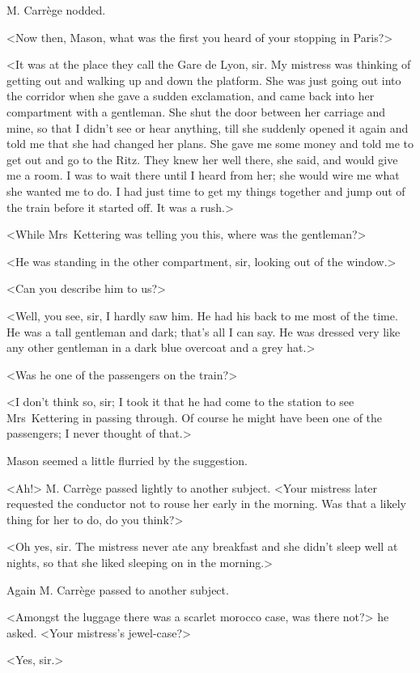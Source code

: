 M. Carrège nodded.

<Now then, Mason, what was the first you heard of your stopping in Paris?>

<It was at the place they call the Gare de Lyon, sir. My mistress was thinking of getting out and walking up and down the platform. She was just going out into the corridor when she gave a sudden exclamation, and came back into her compartment with a gentleman. She shut the door between her carriage and mine, so that I didn't see or hear anything, till she suddenly opened it again and told me that she had changed her plans. She gave me some money and told me to get out and go to the Ritz. They knew her well there, she said, and would give me a room. I was to wait there until I heard from her; she would wire me what she wanted me to do. I had just time to get my things together and jump out of the train before it started off. It was a rush.>

<While Mrs~Kettering was telling you this, where was the gentleman?>

<He was standing in the other compartment, sir, looking out of the window.>

<Can you describe him to us?>

<Well, you see, sir, I hardly saw him. He had his back to me most of the time. He was a tall gentleman and dark; that's all I can say. He was dressed very like any other gentleman in a dark blue overcoat and a grey hat.>

<Was he one of the passengers on the train?>

<I don't think so, sir; I took it that he had come to the station to see Mrs~Kettering in passing through. Of course he might have been one of the passengers; I never thought of that.>

Mason seemed a little flurried by the suggestion.

<Ah!> M. Carrège passed lightly to another subject. <Your mistress later requested the conductor not to rouse her early in the morning. Was that a likely thing for her to do, do you think?>

<Oh yes, sir. The mistress never ate any breakfast and she didn't sleep well at nights, so that she liked sleeping on in the morning.>

Again M. Carrège passed to another subject.

<Amongst the luggage there was a scarlet morocco case, was there not?> he asked. <Your mistress's jewel-case?>

<Yes, sir.>

